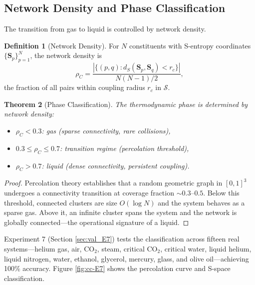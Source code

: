 \documentclass[twocolumn,10pt,a4paper]{article}
\newtheorem{theorem}{Theorem}[section]
\theoremstyle{definition}
\newtheorem{definition}[theorem]{Definition}
\theoremstyle{remark}
\newcommand{\Sspace}{\mathcal{S}}
\begin{document}
\subsection{Network Density and Phase Classification}

The transition from gas to liquid is controlled by network density.

\begin{definition}[Network Density]
\label{def:network_density}
For $N$ constituents with S-entropy coordinates $\{\mathbf{S}_p\}_{p=1}^{N}$, the network density is
\begin{equation}
\rho_C = \frac{|\{(p,q): d_S(\mathbf{S}_p, \mathbf{S}_q) < r_c\}|}{N(N-1)/2},
\label{eq:network_density}
\end{equation}
the fraction of all pairs within coupling radius $r_c$ in $\Sspace$.
\end{definition}

\begin{theorem}[Phase Classification]
\label{thm:phase_class}
The thermodynamic phase is determined by network density:
\begin{itemize}[leftmargin=1.2em,nosep]
\item $\rho_C < 0.3$: gas (sparse connectivity, rare collisions),
\item $0.3 \leq \rho_C \leq 0.7$: transition regime (percolation threshold),
\item $\rho_C > 0.7$: liquid (dense connectivity, persistent coupling).
\end{itemize}
\end{theorem}

\begin{proof}
Percolation theory \citep{stauffer1979} establishes that a random geometric graph in $[0,1]^3$ undergoes a connectivity transition at coverage fraction $\sim 0.3$--$0.5$. Below this threshold, connected clusters are size $O(\log N)$ and the system behaves as a sparse gas. Above it, an infinite cluster spans the system and the network is globally connected---the operational signature of a liquid.
\end{proof}

Experiment 7 (Section \ref{sec:val_E7}) tests the classification across fifteen real systems---helium gas, air, CO$_2$, steam, critical CO$_2$, critical water, liquid helium, liquid nitrogen, water, ethanol, glycerol, mercury, glass, and olive oil---achieving 100\% accuracy. Figure \ref{fig:cc-E7} shows the percolation curve and S-space classification.
\end{document}
